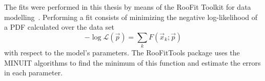 The fits were performed in this thesis by means of the RooFit Toolkit for data modelling~\cite{RooFit}. Performing a fit consists of minimizing the negative log-likelihood of a PDF calculated over the data set %
%
\begin{equation}
-\log \mathcal{L} (\vec{p}) = \sum_k F(\vec{x}_k;\vec{p})
\end{equation}
%
with respect to the model's parameters.  The RooFitTools package uses the MINUIT\cite{MINUIT} algorithms to find the minimum of this function and estimate the errors in each parameter.  %







